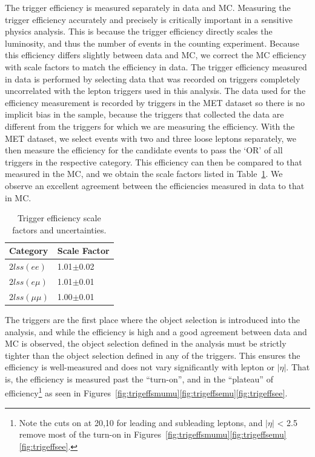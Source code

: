 The trigger efficiency is measured separately in data and MC. Measuring the trigger efficiency accurately and precisely is critically
important in a sensitive physics analysis. This is because the trigger efficiency directly scales the luminosity, and thus the number
of events in the counting experiment.
Because this efficiency differs slightly between data and MC, we correct the MC efficiency with scale factors to match the
efficiency in data. The trigger efficiency measured in data is performed by selecting data that was recorded on triggers completely
uncorrelated with the lepton triggers used in this analysis. The data used for the efficiency measurement is recorded by triggers in
the MET dataset so there is no implicit bias in the sample, because the triggers that collected the data are different from the triggers
for which we are measuring the efficiency. With the MET dataset, we select events with two and three loose leptons separately, we then measure
the efficiency for the candidate events to pass the `OR' of all triggers in the respective category. This efficiency can then be compared
to that measured in the MC, and we obtain the scale factors listed in Table~\ref{tab:trigger_sf}. We observe an excellent agreement between
the efficiencies measured in data to that in MC. 


\begin{table}[hbtp]
\centering
\caption{Trigger efficiency scale factors and uncertainties.}
\begin{tabular}{l|l}
\hline
Category & Scale Factor \\
\hline
$2lss (ee)$ & 1.01$\pm$0.02 \\
$2lss (e\mu)$ & 1.01$\pm$0.01 \\
$2lss (\mu\mu)$ & 1.00$\pm$0.01 \\
\hline
\end{tabular}
\label{tab:trigger_sf}
\end{table}

The triggers are the first place where the object selection is introduced into the analysis, and while the efficiency is high
and a good agreement between data and MC is observed,
the object selection defined in the analysis must be strictly tighter than the object selection defined in any of the triggers. This ensures
the efficiency is well-measured and does not vary significantly with lepton \pt or $|\eta|$. That is, the efficiency is measured past the ``turn-on'',
and in the ``plateau'' of efficiency\footnote{Note the cuts on \pt at 20,10 for leading and subleading leptons, and $|\eta|$ < 2.5 remove most
of the turn-on in Figures~\ref{fig:trigeffsmumu}\ref{fig:trigeffsemu}\ref{fig:trigeffsee}.}
as seen in Figures~\ref{fig:trigeffsmumu}\ref{fig:trigeffsemu}\ref{fig:trigeffsee}. 

